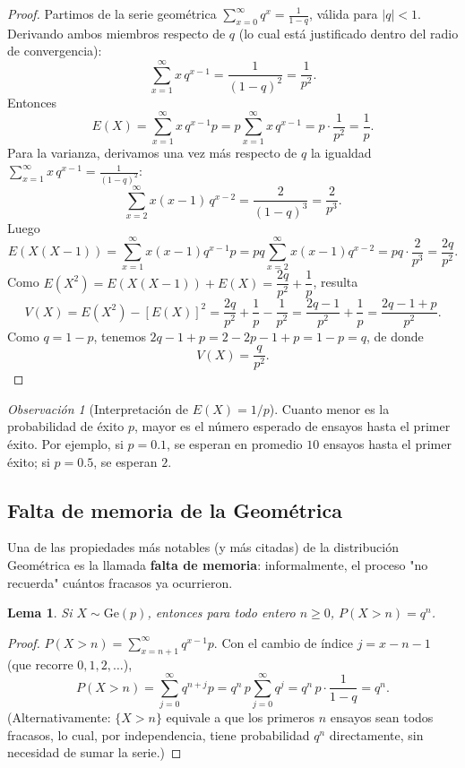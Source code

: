 \documentclass[11pt,a4paper]{article}
\theoremstyle{plain}
\newtheorem{lema}[teorema]{Lema}
\theoremstyle{definition}
\theoremstyle{remark}
\newtheorem{observacion}[teorema]{Observación}
\begin{document}
\begin{proof}
Partimos de la serie geométrica $\displaystyle\sum_{x=0}^\infty q^x=\frac{1}{1-q}$, válida para $|q|<1$. Derivando ambos miembros respecto de $q$ (lo cual está justificado dentro del radio de convergencia):
$$\sum_{x=1}^\infty x\,q^{x-1}=\frac{1}{(1-q)^2}=\frac{1}{p^2}.$$
Entonces
$$E(X)=\sum_{x=1}^\infty x\,q^{x-1}p=p\sum_{x=1}^\infty x\,q^{x-1}=p\cdot\frac{1}{p^2}=\frac1p.$$
Para la varianza, derivamos una vez más respecto de $q$ la igualdad $\displaystyle\sum_{x=1}^\infty x\,q^{x-1}=\frac{1}{(1-q)^2}$:
$$\sum_{x=2}^\infty x(x-1)\,q^{x-2}=\frac{2}{(1-q)^3}=\frac{2}{p^3}.$$
Luego
$$E(X(X-1))=\sum_{x=1}^\infty x(x-1)q^{x-1}p=pq\sum_{x=2}^\infty x(x-1)q^{x-2}=pq\cdot\frac{2}{p^3}=\frac{2q}{p^2}.$$
Como $E(X^2)=E(X(X-1))+E(X)=\dfrac{2q}{p^2}+\dfrac1p$, resulta
$$V(X)=E(X^2)-[E(X)]^2=\frac{2q}{p^2}+\frac1p-\frac{1}{p^2}=\frac{2q-1}{p^2}+\frac1p=\frac{2q-1+p}{p^2}.$$
Como $q=1-p$, tenemos $2q-1+p=2-2p-1+p=1-p=q$, de donde
$$V(X)=\frac{q}{p^2}.$$
\end{proof}

\begin{observacion}[Interpretación de $E(X)=1/p$]
Cuanto menor es la probabilidad de éxito $p$, mayor es el número esperado de ensayos hasta el primer éxito. Por ejemplo, si $p=0.1$, se esperan en promedio $10$ ensayos hasta el primer éxito; si $p=0.5$, se esperan $2$.
\end{observacion}

\subsection{Falta de memoria de la Geométrica}

Una de las propiedades más notables (y más citadas) de la distribución Geométrica es la llamada \textbf{falta de memoria}: informalmente, el proceso "no recuerda" cuántos fracasos ya ocurrieron.

\begin{lema}
Si $X\sim\text{Ge}(p)$, entonces para todo entero $n\ge0$, $P(X>n)=q^n$.
\end{lema}
\begin{proof}
$P(X>n)=\displaystyle\sum_{x=n+1}^\infty q^{x-1}p$. Con el cambio de índice $j=x-n-1$ (que recorre $0,1,2,\dots$),
$$P(X>n)=\sum_{j=0}^\infty q^{n+j}p=q^n\,p\sum_{j=0}^\infty q^j=q^n\,p\cdot\frac{1}{1-q}=q^n.$$
(Alternativamente: $\{X>n\}$ equivale a que los primeros $n$ ensayos sean todos fracasos, lo cual, por independencia, tiene probabilidad $q^n$ directamente, sin necesidad de sumar la serie.)
\end{proof}
\end{document}
